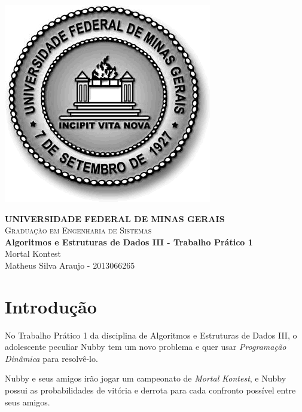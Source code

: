\documentclass[10pt,a4paper]{article}
\begin{document}

	\begin{minipage}[b]{0.05\linewidth}
		\includegraphics[scale=0.3]{ufmg}
	\end{minipage}
	\hfill
	\begin{minipage}[b]{0.95\linewidth}
		\begin{flushright}
			\textbf{UNIVERSIDADE FEDERAL DE MINAS GERAIS} \\
			\textsc{Graduação em Engenharia de Sistemas} \\
			\textbf{Algoritmos e Estruturas de Dados III - Trabalho Prático 1} \\
			Mortal Kontest \\
			Matheus Silva Araujo - 2013066265
		\end{flushright}
	\end{minipage}

	\begin{center}
		\hrulefill
	\end{center}


	\section{Introdução}

	No Trabalho Prático 1 da disciplina de Algoritmos e Estruturas de Dados III, o adolescente peculiar Nubby tem um novo problema e quer usar \emph{Programação Dinâmica} para resolvê-lo.

	Nubby e seus amigos irão jogar um campeonato de \emph{Mortal Kontest}, e Nubby possui as probabilidades de vitória e derrota para cada confronto possível entre seus amigos.
\end{document}
